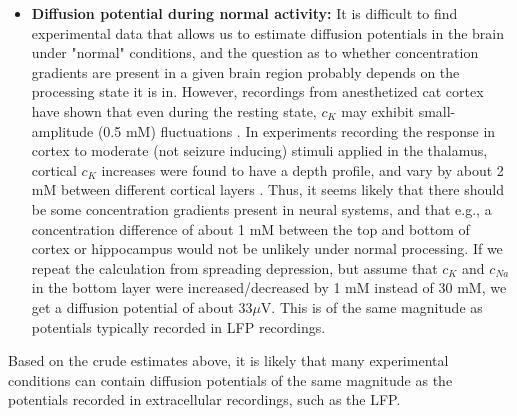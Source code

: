 \begin{itemize}
\item{\bf Diffusion potential during normal activity:} It is difficult to find experimental data that allows us to estimate diffusion potentials in the brain under "normal" conditions, and the question as to whether concentration gradients are present in a given brain region probably depends on the processing state it is in. However, recordings from anesthetized cat cortex have shown that even during the resting state, $c_K$ may exhibit small-amplitude (0.5 mM) fluctuations \citep{MCCREERY1983}. In experiments recording the response in cortex to moderate (not seizure inducing) stimuli applied in the thalamus, cortical $c_K$ increases were found to have a depth profile, and vary by about 2 mM between different cortical layers \citep{Cordingley1978}. Thus, it seems likely that there should be some concentration gradients present in neural systems, and that e.g., a concentration difference of about 1 mM between the top and bottom of cortex or hippocampus would not be unlikely under normal processing. If we repeat the calculation from spreading depression, but assume that $c_{K}$ and $c_{Na}$ in the bottom layer were increased/decreased by 1 mM instead of 30 mM, we get a diffusion potential of about $33 \mu$V. This is of the same magnitude as potentials typically recorded in LFP recordings. 

\end{itemize}

Based on the crude estimates above, it is likely that many experimental conditions can contain diffusion potentials of the same magnitude as the potentials recorded in extracellular recordings, such as the LFP. 


\subsubsection{}

